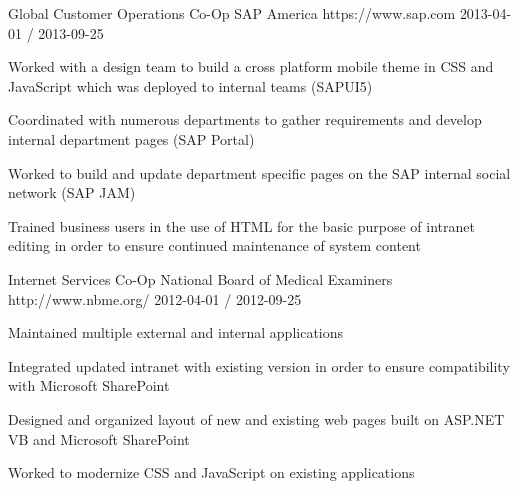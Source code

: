 \begin{cventries}
  \cventry
    {Global Customer Operations Co-Op}
    {SAP America}
    {https://www.sap.com}
    {2013-04-01 / 2013-09-25}
    {
          \begin{cvitems}
                \item{Worked with a design team to build a cross platform mobile theme in CSS and JavaScript which was deployed to internal teams (SAPUI5)}
                \item{Coordinated with numerous departments to gather requirements and develop internal department pages (SAP Portal)}
                \item{Worked to build and update department specific pages on the SAP internal social network (SAP JAM)}
                \item{Trained business users in the use of HTML for the basic purpose of intranet editing in order to ensure continued maintenance of system content}
          \end{cvitems}
    }
 
  \cventry
    {Internet Services Co-Op}
    {National Board of Medical Examiners}
    {http://www.nbme.org/}
    {2012-04-01 / 2012-09-25}
    {
          \begin{cvitems}
                \item{Maintained multiple external and internal applications}
                \item{Integrated updated intranet with existing version in order to ensure compatibility with Microsoft SharePoint}
                \item{Designed and organized layout of new and existing web pages built on ASP.NET VB and Microsoft SharePoint}
                \item{Worked to modernize CSS and JavaScript on existing applications}
          \end{cvitems}
    }
 

\end{cventries}

